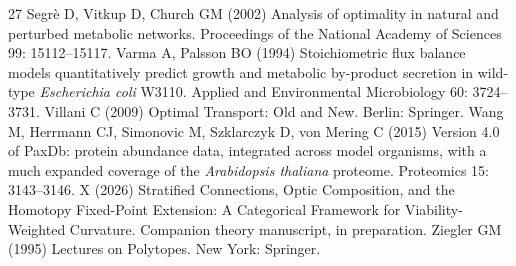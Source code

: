 \begin{thebibliography}{27}
Segr{\`e} D, Vitkup D, Church GM (2002) Analysis of optimality in natural and perturbed metabolic
             networks. Proceedings of the National Academy of Sciences 99: 15112--15117.
Varma A, Palsson BO (1994) Stoichiometric flux balance models quantitatively predict
             growth and metabolic by-product secretion in wild-type
             \emph{Escherichia coli} {W3110}. Applied and Environmental Microbiology 60: 3724--3731.
Villani C (2009) Optimal Transport: Old and New. Berlin: Springer.
Wang M, Herrmann CJ, Simonovic M, Szklarczyk D, von Mering C (2015) Version 4.0 of {PaxDb}: protein abundance data, integrated
             across model organisms, with a much expanded coverage of the
             \emph{Arabidopsis thaliana} proteome. Proteomics 15: 3143--3146.
X (2026) Stratified Connections, Optic Composition, and the Homotopy
           Fixed-Point Extension: A Categorical Framework for
           Viability-Weighted Curvature. Companion theory manuscript, in preparation.
Ziegler GM (1995) Lectures on Polytopes. New York: Springer.
\end{thebibliography}

